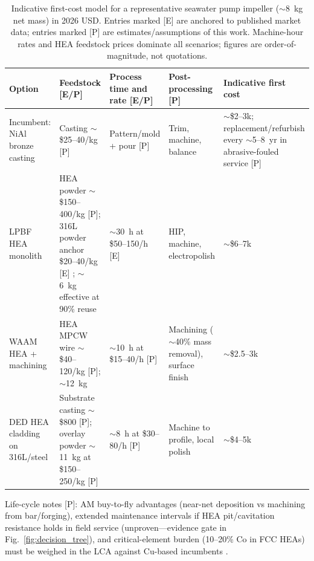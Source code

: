 \begin{table}[t]
\centering
\caption{Indicative first-cost model for a representative seawater pump impeller ($\sim$8~kg net mass) in 2026 USD. Entries marked [E] are anchored to published market data; entries marked [P] are estimates/assumptions of this work. Machine-hour rates and HEA feedstock prices dominate all scenarios; figures are order-of-magnitude, not quotations.}
\label{tab:costmodel}
\footnotesize
\begin{tabularx}{\textwidth}{@{}lXXXX@{}}
\toprule
Option & Feedstock [E/P] & Process time and rate [E/P] & Post-processing [P] & Indicative first cost \\
\midrule
Incumbent: NiAl bronze casting & Casting $\sim$\$25--40/kg [P] & Pattern/mold + pour [P] & Trim, machine, balance & $\sim$\$2--3k; replacement/refurbish every $\sim$5--8~yr in abrasive-fouled service [P] \\
LPBF HEA monolith & HEA powder $\sim$\$150--400/kg [P]; 316L powder anchor \$20--40/kg [E] \cite{cost_buyer2025,cost_lpbf2026}; $\sim$6~kg effective at 90\% reuse & $\sim$30~h at \$50--150/h [E] \cite{cost_lpbf2026,printer_guide2026} & HIP, machine, electropolish & $\sim$\$6--7k \\
WAAM HEA + machining & HEA MPCW wire $\sim$\$40--120/kg [P]; $\sim$12~kg & $\sim$10~h at \$15--40/h [P] & Machining ($\sim$40\% mass removal), surface finish & $\sim$\$2.5--3k \\
DED HEA cladding on 316L/steel & Substrate casting $\sim$\$800 [P]; overlay powder $\sim$11~kg at \$150--250/kg [P] & $\sim$8~h at \$30--80/h [P] & Machine to profile, local polish & $\sim$\$4--5k \\
\bottomrule
\end{tabularx}

\vspace{4pt}
\footnotesize Life-cycle notes [P]: AM buy-to-fly advantages (near-net deposition vs machining from bar/forging), extended maintenance intervals if HEA pit/cavitation resistance holds in field service (unproven---evidence gate in Fig.~\ref{fig:decision_tree}), and critical-element burden (10--20\% Co in FCC HEAs) must be weighed in the LCA against Cu-based incumbents \cite{nass2025marine}.

\end{table}

